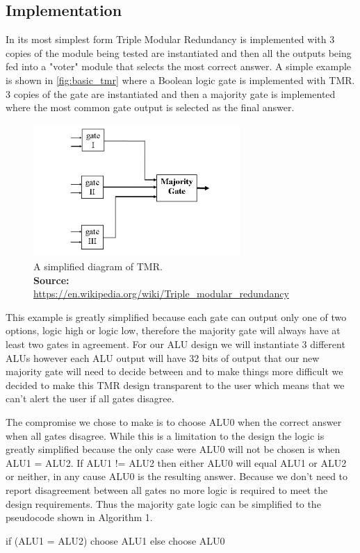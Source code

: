 \documentclass[12pt]{article}
\newcommand*{\captionsource}[2]{%
  \caption[{#1}]{%
    #1%
    \\\hspace{\linewidth}%
    \textbf{Source:} #2%
  }%
}
\begin{document}
\subsection{Implementation}
In its most simplest form Triple Modular Redundancy is implemented with 3 copies of the module being tested are instantiated and then all the outputs being fed into a "voter" module that selects the most correct answer. A simple example is shown in \autoref{fig:basic_tmr} where a Boolean logic gate is implemented with TMR. 3 copies of the gate are instantiated and then a majority gate is implemented where the most common gate output is selected as the final answer.

\begin{figure}[H]
    \centering
    \includegraphics[width=0.7\textwidth]{Triple_Modular_Redundancy.jpg}
    \captionsource{A simplified diagram of TMR.}{\url{https://en.wikipedia.org/wiki/Triple\_modular\_redundancy}}
    \label{fig:basic_tmr}
\end{figure}

This example is greatly simplified because each gate can output only one of two options, logic high or logic low, therefore the majority gate will always have at least two gates in agreement. For our ALU design we will instantiate 3 different ALUs however each ALU output will have 32 bits of output that our new majority gate will need to decide between and to make things more difficult we decided to make this TMR design transparent to the user which means that we can't alert the user if all gates disagree.

The compromise we chose to make is to choose ALU0 when the correct answer when all gates disagree. While this is a limitation to the design the logic is greatly simplified because the only case were ALU0 will not be chosen is when ALU1 = ALU2. If ALU1 != ALU2 then either ALU0 will equal ALU1 or ALU2 or neither, in any cause ALU0 is the resulting answer. Because we don't need to report disagreement between all gates no more logic is required to meet the design requirements. Thus the majority gate logic can be simplified to the pseudocode shown in Algorithm 1.
\newpage %
\begin{algorithm}[caption={ALU Majority Gate Logic.}, label={majority_gate_logic}]
if (ALU1 = ALU2)
    choose ALU1
else
    choose ALU0
\end{algorithm}
\end{document}
